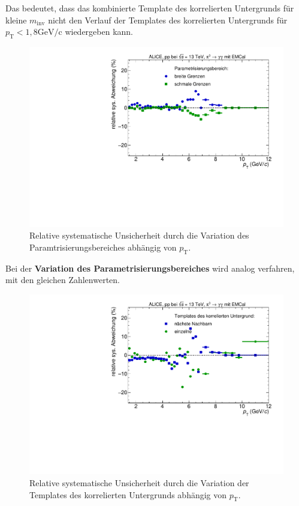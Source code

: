 Das bedeutet, dass das kombinierte Template des korrelierten Untergrunds für kleine $m_\text{inv}$ nicht den Verlauf der Templates des korrelierten Untergrunds für $p_\text{T} < 1,8 \text{GeV/c}$ wiedergeben kann.
\begin{figure}[t!]
\centering
\includegraphics[width=.65\linewidth]{YieldsSysUncerFitRange_Data_2016.pdf}
\caption{Relative systematische Unsicherheit durch die Variation des Paramtrisierungsbereiches abhängig von $p_\text{T}$.}
\label{fig:ParamSys}
\end{figure}
\newline
Bei der \textbf{Variation des Parametrisierungsbereiches} wird analog verfahren, mit den gleichen Zahlenwerten.
\begin{figure}[t!]
\centering
\includegraphics[width=.65\linewidth]{YieldsSysUncerBkgVariation_Data_2016.pdf}
\caption{Relative systematische Unsicherheit durch die Variation der Templates des korrelierten Untergrunds abhängig von $p_\text{T}$.}
\label{fig:BkgSys}
\end{figure}
